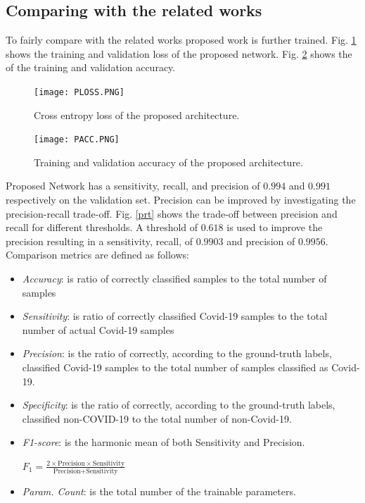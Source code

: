 \subsection{Comparing with the related works}
To fairly compare with the related works proposed work is further trained. Fig. \ref{ploss} shows the training and validation loss of the proposed network. Fig. \ref{pacc} shows the of the training and validation accuracy. 
\begin{center}
\begin{figure}[htbp]
\centerline{\texttt{[image: PLOSS.PNG]}}
\caption{Cross entropy loss of the proposed architecture.}
\label{ploss}
\end{figure}
\end{center}
\begin{center}
\begin{figure}[htbp]
\centerline{\texttt{[image: PACC.PNG]}}
\caption{Training and validation accuracy of the proposed architecture.}
\label{pacc}
\end{figure}
\end{center}
Proposed Network has a sensitivity, recall, and precision of $0.994$ and $0.991$ respectively on the validation set. Precision can be improved by investigating the precision-recall trade-off. Fig. \ref{prt} shows the trade-off between precision and recall for different thresholds. A threshold of $0.618$ is used to improve the precision resulting in a sensitivity, recall, of $0.9903$ and precision of $0.9956$.
Comparison metrics are defined as follows:
\begin{itemize}
\item \textit{Accuracy}: is ratio of correctly classified samples to the total number of samples
\item \textit{Sensitivity}: is ratio of correctly classified Covid-19 samples to the total number of actual Covid-19 samples 
\item \textit{Precision}: is the ratio of correctly, according to the ground-truth labels, classified Covid-19 samples to the total number of samples classified as Covid-19.
\item \textit{Specificity}: is the ratio of correctly, according to the ground-truth labels, classified non-COVID-19 to the total number of non-Covid-19.
\item \textit{F1-score}: is the harmonic mean of both Sensitivity and Precision.
\begin{center}  
 $F_{1}=\frac{2\times\text{Precision} \times \text{Sensitivity}}{\text{Precision} + \text{Sensitivity}}$
\end{center}
\item \textit{Param. Count}: is the total number of the trainable parameters.
\end{itemize}


